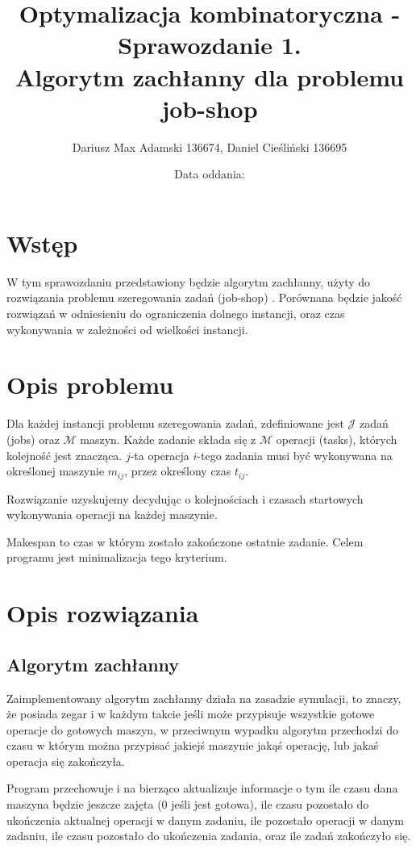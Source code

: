 \documentclass[11pt,twocolumn]{article}
\title{Optymalizacja kombinatoryczna - Sprawozdanie 1. \\ Algorytm zachłanny dla problemu job-shop}
\author{Dariusz Max Adamski 136674, Daniel Cieśliński 136695}
\affil{\{dariusz.adamski,daniel.cieslinski\}@student.put.poznan.pl}
\date{Data oddania:}
\begin{document}
\maketitle


\section*{Wstęp}

W tym sprawozdaniu przedstawiony będzie algorytm zachłanny, użyty do rozwiązania problemu szeregowania zadań (job-shop) \cite{ortools}.
Porównana będzie jakość rozwiązań w odniesieniu do ograniczenia dolnego instancji,
oraz czas wykonywania w zależności od wielkości instancji.


\section{Opis problemu}

Dla każdej instancji problemu szeregowania zadań,
zdefiniowane jest $\mathcal{J}$ zadań (jobs) oraz $\mathcal{M}$ maszyn.
Każde zadanie składa się z $\mathcal{M}$ operacji (tasks),
których kolejność jest znacząca.
$j$-ta operacja $i$-tego zadania musi być wykonywana na określonej maszynie $m_{ij}$,
przez określony czas $t_{ij}$.

Rozwiązanie uzyskujemy decydując o kolejnościach i
czasach startowych wykonywania operacji na każdej maszynie.

Makespan to czas w którym zostało zakończone ostatnie zadanie.
Celem programu jest minimalizacja tego kryterium.


\section{Opis rozwiązania}

\subsection{Algorytm zachłanny}

Zaimplementowany algorytm zachłanny działa na zasadzie symulacji,
to znaczy, że posiada zegar i w każdym takcie jeśli może przypisuje
wszystkie gotowe operacje do gotowych maszyn, 
w przeciwnym wypadku algorytm przechodzi do
czasu w którym można przypisać jakiejś maszynie jakąś operację,
lub jakaś operacja się zakończyła.

Program przechowuje i na bierząco aktualizuje informacje o tym
ile czasu dana maszyna będzie jeszcze zajęta (0 jeśli jest gotowa),
ile czasu pozostało do ukończenia aktualnej operacji w danym zadaniu,
ile pozostało operacji w danym zadaniu,
ile czasu pozostało do ukończenia zadania,
oraz ile zadań zakończyło się.
\end{document}
